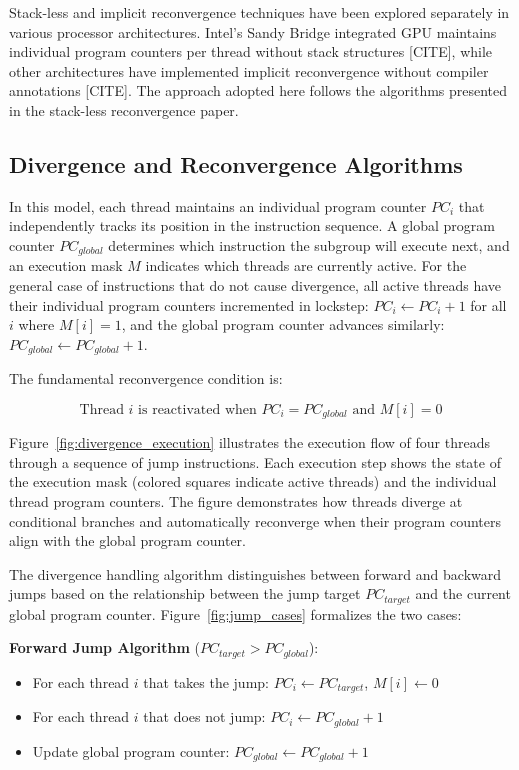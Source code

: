 Stack-less and implicit reconvergence techniques have been explored separately
in various processor architectures. Intel's Sandy Bridge integrated GPU
maintains individual program counters per thread without stack structures
[CITE], while other architectures have implemented implicit reconvergence
without compiler annotations [CITE]. The approach adopted here follows the
algorithms presented in the stack-less reconvergence paper.

\subsection{Divergence and Reconvergence Algorithms}

In this model, each thread maintains an individual program counter $PC_i$ that
independently tracks its position in the instruction sequence. A global program
counter $PC_{global}$ determines which instruction the subgroup will execute
next, and an execution mask $M$ indicates which threads are currently active.
For the general case of instructions that do not cause divergence, all active
threads have their individual program counters incremented in lockstep: $PC_i
\leftarrow PC_i + 1$ for all $i$ where $M[i] = 1$, and the global program
counter advances similarly: $PC_{global} \leftarrow PC_{global} + 1$.

The fundamental reconvergence condition is:

$$\text{Thread } i \text{ is reactivated when } PC_i = PC_{global} \text{ and } M[i] = 0$$

Figure~\ref{fig:divergence_execution} illustrates the execution flow of four
threads through a sequence of jump instructions. Each execution step shows the
state of the execution mask (colored squares indicate active threads) and the
individual thread program counters. The figure demonstrates how threads diverge
at conditional branches and automatically reconverge when their program
counters align with the global program counter.

The divergence handling algorithm distinguishes between forward and backward
jumps based on the relationship between the jump target $PC_{target}$ and the
current global program counter. Figure~\ref{fig:jump_cases} formalizes the two
cases:

\textbf{Forward Jump Algorithm} ($PC_{target} > PC_{global}$):
\begin{itemize}
    \item For each thread $i$ that takes the jump: $PC_i
    \leftarrow PC_{target}$, $M[i] \leftarrow 0$
    \item For each thread $i$ that does not jump: $PC_i \leftarrow PC_{global} + 1$
    \item Update global program counter: $PC_{global} \leftarrow PC_{global} + 1$
\end{itemize}

